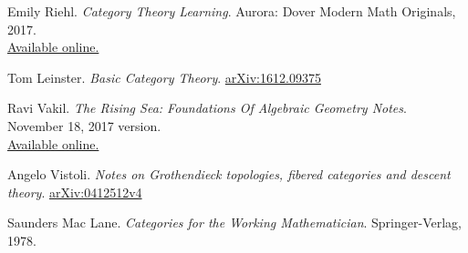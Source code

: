 \vspace{0.1in}

\begin{enumerate}[leftmargin=*,itemsep=1em,label={[\arabic*]}]
\item Emily Riehl. \emph{Category Theory Learning}. Aurora: Dover Modern Math Originals, 2017.\\[0.5em]
\href{https://math.jhu.edu/~eriehl/context.pdf}{\color{darkblue} Available online.}
\item Tom Leinster. \emph{Basic Category Theory}. \href{https://arxiv.org/abs/1612.09375}{\color{darkblue} arXiv:1612.09375}
\item Ravi Vakil. \emph{The Rising Sea: Foundations Of Algebraic Geometry Notes}.  November 18, 2017 version.\\[0.5em]
\href{http://math.stanford.edu/~vakil/216blog/FOAGnov1817public.pdf}{\color{darkblue} Available online.}
\item Angelo Vistoli. \emph{Notes on Grothendieck topologies, fibered categories and descent theory}. \href{https://arxiv.org/abs/math/0412512}{\color{darkblue}  arXiv:0412512v4}
\item Saunders Mac Lane. \emph{Categories for the Working Mathematician}. Springer-Verlag, 1978.
\end{enumerate}